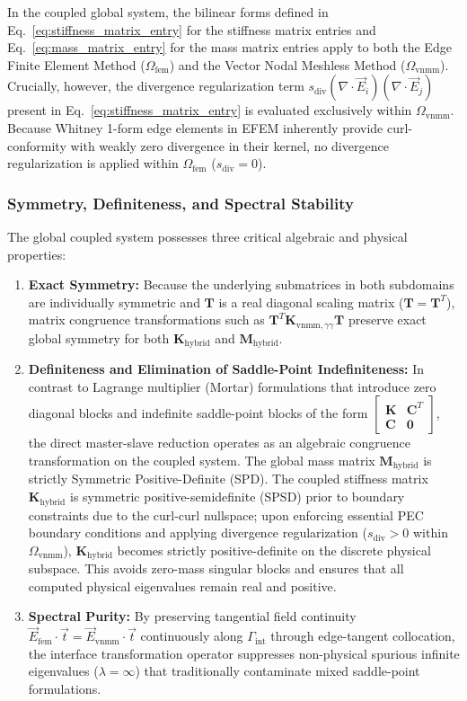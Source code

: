 \documentclass[preprint,12pt]{elsarticle}
\begin{document}
In the coupled global system, the bilinear forms defined in Eq.~\eqref{eq:stiffness_matrix_entry} for the stiffness matrix entries and Eq.~\eqref{eq:mass_matrix_entry} for the mass matrix entries apply to both the Edge Finite Element Method ($\Omega_{\mathrm{fem}}$) and the Vector Nodal Meshless Method ($\Omega_{\mathrm{vnmm}}$). Crucially, however, the divergence regularization term $s_{\mathrm{div}} (\nabla \cdot \vec{E}_i)(\nabla \cdot \vec{E}_j)$ present in Eq.~\eqref{eq:stiffness_matrix_entry} is evaluated exclusively within $\Omega_{\mathrm{vnmm}}$. Because Whitney 1-form edge elements in EFEM inherently provide curl-conformity with weakly zero divergence in their kernel, no divergence regularization is applied within $\Omega_{\mathrm{fem}}$ ($s_{\mathrm{div}} = 0$).

\subsubsection{Symmetry, Definiteness, and Spectral Stability}
The global coupled system possesses three critical algebraic and physical properties:
\begin{enumerate}
    \item \textbf{Exact Symmetry:} Because the underlying submatrices in both subdomains are individually symmetric and $\mathbf{T}$ is a real diagonal scaling matrix ($\mathbf{T} = \mathbf{T}^T$), matrix congruence transformations such as $\mathbf{T}^T \mathbf{K}_{\mathrm{vnmm}, \gamma\gamma} \mathbf{T}$ preserve exact global symmetry for both $\mathbf{K}_{\mathrm{hybrid}}$ and $\mathbf{M}_{\mathrm{hybrid}}$.
    \item \textbf{Definiteness and Elimination of Saddle-Point Indefiniteness:} In contrast to Lagrange multiplier (Mortar) formulations that introduce zero diagonal blocks and indefinite saddle-point blocks of the form $\begin{bmatrix} \mathbf{K} & \mathbf{C}^T \\ \mathbf{C} & \mathbf{0} \end{bmatrix}$, the direct master-slave reduction operates as an algebraic congruence transformation on the coupled system. The global mass matrix $\mathbf{M}_{\mathrm{hybrid}}$ is strictly Symmetric Positive-Definite (SPD). The coupled stiffness matrix $\mathbf{K}_{\mathrm{hybrid}}$ is symmetric positive-semidefinite (SPSD) prior to boundary constraints due to the curl-curl nullspace; upon enforcing essential PEC boundary conditions and applying divergence regularization ($s_{\mathrm{div}} > 0$ within $\Omega_{\mathrm{vnmm}}$), $\mathbf{K}_{\mathrm{hybrid}}$ becomes strictly positive-definite on the discrete physical subspace. This avoids zero-mass singular blocks and ensures that all computed physical eigenvalues remain real and positive.
    \item \textbf{Spectral Purity:} By preserving tangential field continuity $\vec{E}_{\mathrm{fem}} \cdot \vec{t} = \vec{E}_{\mathrm{vnmm}} \cdot \vec{t}$ continuously along $\Gamma_{\mathrm{int}}$ through edge-tangent collocation, the interface transformation operator suppresses non-physical spurious infinite eigenvalues ($\lambda = \infty$) that traditionally contaminate mixed saddle-point formulations.
\end{enumerate}
\end{document}

